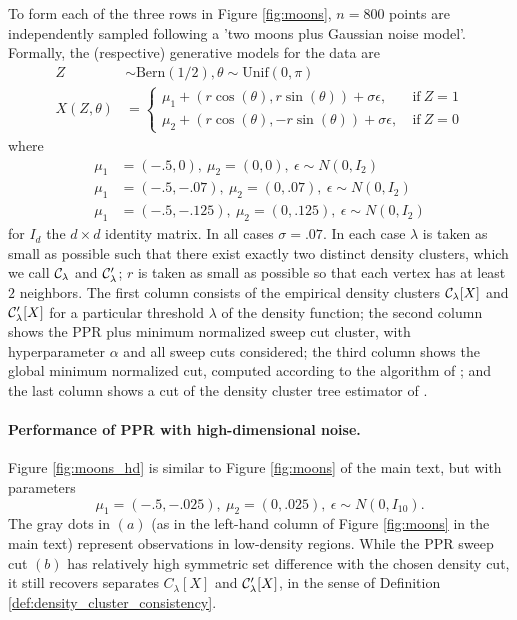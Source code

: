 To form each of the three rows in Figure \ref{fig:moons}, $n = 800$ points are independently sampled following a 'two moons plus Gaussian noise model'. Formally, the (respective) generative models for the data are
\begin{align}
Z & \sim \textrm{Bern}(1/2), \theta \sim \textrm{Unif}(0, \pi) \\
X(Z,\theta) & = 
\begin{cases}
\mu_1 + (r \cos(\theta), r \sin(\theta)) + \sigma \epsilon,~ & \text{if}~ Z = 1 \\
\mu_2 + (r \cos(\theta), - r \sin(\theta)) + \sigma \epsilon,~ & \text{if}~ Z = 0
\end{cases}
\end{align}
where 
\begin{align*}
\mu_1 & = (-.5, 0),~ \mu_2 = (0,0),~ \epsilon \sim N(0, I_2) \tag{row 1} \\
\mu_1 & = (-.5, -.07),~ \mu_2 = (0,.07),~ \epsilon \sim N(0, I_2) \tag{row 2} \\
\mu_1 & = (-.5, -.125),~ \mu_2 = (0,.125),~ \epsilon \sim N(0, I_2) \tag{row 3} 
\end{align*}
for $I_d$ the $d \times d$ identity matrix. In all cases $\sigma = .07$. In each case $\lambda$ is taken as small as possible such that there exist exactly two distinct density clusters, which we call $\mathcal{C}_{\lambda}$ and $\mathcal{C}_{\lambda}'$; $r$ is taken as small as possible so that each vertex has at least $2$ neighbors. The first column consists of the empirical density clusters $\mathcal{C}_{\lambda}[X]$ and $\mathcal{C}_{\lambda}'[X]$ for a particular threshold $\lambda$ of the density function; the second column shows the PPR plus minimum normalized sweep cut cluster, with hyperparameter $\alpha$ and all sweep cuts considered; the third column shows the global minimum normalized cut, computed according to the algorithm of \cite{bresson2013}; and the last column shows a cut of the density cluster tree estimator of \cite{chaudhuri2010}.

\paragraph{Performance of PPR with high-dimensional noise.} Figure \ref{fig:moons_hd} is similar to Figure \ref{fig:moons} of the main text, but with parameters
\begin{equation*}
\mu_1 = (-.5, -.025),~ \mu_2 = (0,.025),~ \epsilon \sim N(0, I_{10}).
\end{equation*}
The gray dots in $(a)$ (as in the left-hand column of Figure \ref{fig:moons} in the main text) represent observations in low-density regions. While the PPR sweep cut $(b)$ has relatively high symmetric set difference with the chosen density cut, it still recovers separates $C_{\lambda}[X]$ and $\mathcal{C}_{\lambda}'[X]$, in the sense of Definition \ref{def:density_cluster_consistency}.


